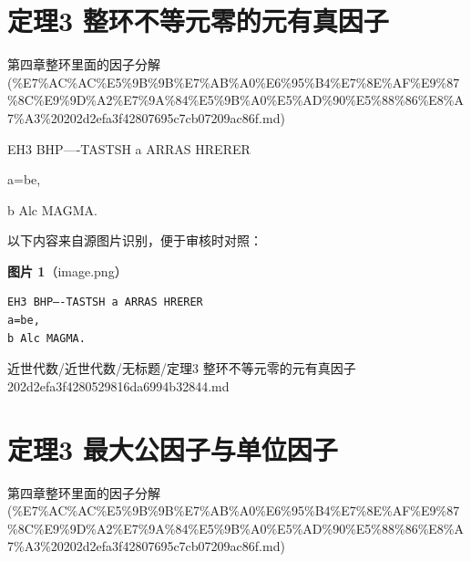 \section*{定理3 整环不等元零的元有真因子}

\begin{note}[来源上级主题]

第四章整环里面的因子分解 (\%E7\%AC\%AC\%E5\%9B\%9B\%E7\%AB\%A0\%E6\%95\%B4\%E7\%8E\%AF\%E9\%87\%8C\%E9\%9D\%A2\%E7\%9A\%84\%E5\%9B\%A0\%E5\%AD\%90\%E5\%88\%86\%E8\%A7\%A3\%20202d2efa3f42807695c7cb07209ac86f.md)

\end{note}

\begin{theorem}[定理3 整环不等元零的元有真因子]

EH3 BHP—-TASTSH a ARRAS HRERER

a=be,

b Alc MAGMA.

\end{theorem}

\begin{note}
以下内容来自源图片识别，便于审核时对照：

\textbf{图片 1}（image.png）
\begin{Verbatim}[fontsize=\small]
EH3 BHP—-TASTSH a ARRAS HRERER
a=be,
b Alc MAGMA.
\end{Verbatim}

\end{note}

\begin{note}[来源路径]

近世代数/近世代数/无标题/定理3 整环不等元零的元有真因子 202d2efa3f4280529816da6994b32844.md

\end{note}

\section*{定理3 最大公因子与单位因子}

\begin{note}[来源上级主题]

第四章整环里面的因子分解 (\%E7\%AC\%AC\%E5\%9B\%9B\%E7\%AB\%A0\%E6\%95\%B4\%E7\%8E\%AF\%E9\%87\%8C\%E9\%9D\%A2\%E7\%9A\%84\%E5\%9B\%A0\%E5\%AD\%90\%E5\%88\%86\%E8\%A7\%A3\%20202d2efa3f42807695c7cb07209ac86f.md)

\end{note}

